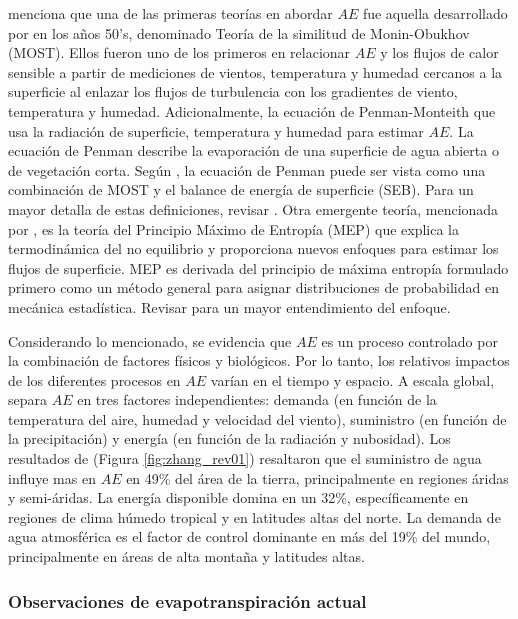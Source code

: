 \documentclass[12pt]{article}
\begin{document}
\citet{wang2012review} menciona que una de las primeras teorías en abordar $AE$ fue aquella desarrollado por \citet{monin1954basic} en los años 50's, denominado Teoría de la similitud de Monin-Obukhov (MOST). Ellos fueron uno de los primeros en relacionar $AE$ y los flujos de calor sensible a partir de mediciones de vientos, temperatura y humedad cercanos a la superficie al enlazar los flujos de turbulencia con los gradientes de viento, temperatura y humedad. Adicionalmente, la ecuación de Penman-Monteith \citep{penman1948natural,monteith1965evaporation} que usa la radiación de superficie, temperatura y humedad para estimar $AE$. La ecuación de Penman describe la evaporación de una superficie de agua abierta o de vegetación corta. Según \citet{wang2012review}, la ecuación de Penman puede ser vista como una combinación de MOST y el balance de energía de superficie (SEB). Para un mayor detalla de estas definiciones, revisar \citet{wang2012review}. Otra emergente teoría, mencionada por \citet{zhang2016review}, es la teoría del Principio Máximo de Entropía (MEP) que explica la termodinámica del no equilibrio y proporciona nuevos enfoques para estimar los flujos de superficie. MEP es derivada del principio de máxima entropía formulado primero como un método general para asignar distribuciones de probabilidad en mecánica estadística. Revisar \citet{zhang2016review} para un mayor entendimiento del enfoque. 

Considerando lo mencionado, se evidencia que $AE$ es un proceso controlado por la combinación de factores físicos y biológicos. Por lo tanto, los relativos impactos de los diferentes procesos en $AE$ varían en el tiempo y espacio. A escala global, \citet{zhang2015vegetation} separa $AE$ en tres factores independientes: demanda (en función de la temperatura del aire, humedad y velocidad del viento), suministro (en función de la precipitación) y energía (en función de la radiación y nubosidad). Los resultados de \citet{zhang2015vegetation} (Figura \ref{fig:zhang_rev01}) resaltaron que el suministro de agua influye mas en $AE$ en 49\% del área de la tierra, principalmente en regiones áridas y semi-áridas. La energía disponible domina en un 32\%, específicamente en regiones de clima húmedo tropical y en latitudes altas del norte. La demanda de agua atmosférica es el factor de control dominante en más del 19\% del mundo, principalmente en áreas de alta montaña y latitudes altas. 



\subsubsection{Observaciones de evapotranspiración actual}
\end{document}
